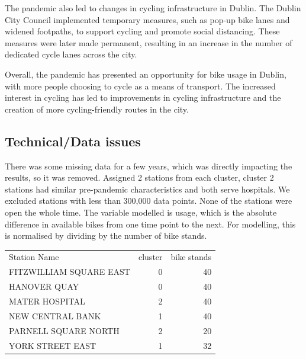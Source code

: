 \documentclass[11pt, singlecolumn, citestyle=authoryear]{elegantbook}
\begin{document}
The pandemic also led to changes in cycling infrastructure in Dublin. The Dublin City Council implemented temporary measures, such as pop-up bike lanes and widened footpaths, to support cycling and promote social distancing. These measures were later made permanent, resulting in an increase in the number of dedicated cycle lanes across the city.

Overall, the pandemic  has presented an opportunity for bike usage in Dublin, with more people choosing to cycle as a means of transport. The increased interest in cycling has led to improvements in cycling infrastructure and the creation of more cycling-friendly routes in the city.



	
\subsection*{Technical/Data issues}
There was some missing data for a few years, which was directly impacting the results, so it was removed. Assigned 2 stations from each cluster,  cluster 2 stations had similar pre-pandemic characteristics and both serve hospitals. We excluded stations with less than 300,000 data points.   None of the stations were open the whole time. The variable modelled is usage, which is the absolute difference in available bikes from one time point to the next.  For modelling, this is normalised by dividing by the number of bike stands.



\begin{table}[h]
	\begin{tabular}{|l|r|r|}
		Station Name & cluster & bike stands\\
		FITZWILLIAM SQUARE EAST & 0 & 40\\
		HANOVER QUAY & 0 & 40\\
		MATER HOSPITAL & 2 & 40\\
		NEW CENTRAL BANK & 1 & 40 \\
		PARNELL SQUARE NORTH & 2 & 20\\
		YORK STREET EAST & 1 & 32 \\
		
	\end{tabular} 
\end{table}
\end{document}
